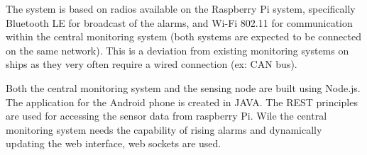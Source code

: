 The system is based on radios available on the Raspberry Pi system, specifically Bluetooth
LE for broadcast of the alarms, and Wi-Fi 802.11 for communication within the central monitoring
system (both systems are expected to be connected on the same network). This is a deviation from existing monitoring systems on ships as they very often require a wired connection (ex: CAN bus).

Both the central monitoring system and the sensing node are built using Node.js. The application for
the Android phone is created in JAVA. The REST principles are used for accessing the sensor
data from raspberry Pi. Wile the central monitoring system needs the capability of rising alarms and dynamically updating the web interface, web sockets are used.

